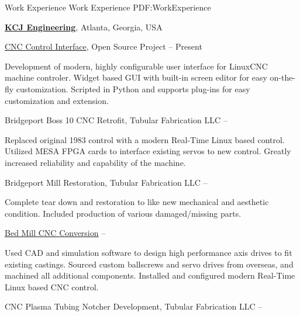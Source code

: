 \documentclass[letterpaper,MMMyyyy,nonstopmode]{resume}
\begin{document}
\begin{Body}

\Section
{Work Experience}
{Work Experience}
{PDF:WorkExperience}

\Entry
\href{http://www.kcjengr.com/}
{\textbf{KCJ Engineering}},
Atlanta, Georgia, USA

\Gap
\BulletItem
\href{https://github.com/KurtJacobson/hazzy/}{CNC Control Interface}, Open Source Project
\hfill
{} --
Present
\begin{Detail}
\SubBulletItem
Development of modern, highly configurable user interface for LinuxCNC machine controler.
\SubBulletItem
Widget based GUI with built-in screen editor for easy on-the-fly customization.
\SubBulletItem
Scripted in Python and supports plug-ins for easy customization and extension.
\end{Detail}

\Gap
{} Bridgeport Boss 10 CNC Retrofit, Tubular Fabrication LLC
\hfill
{} --
\begin{Detail}
\SubBulletItem
Replaced original 1983 control with a modern Real-Time Linux based control.
\SubBulletItem
Utilized MESA FPGA cards to interface existing servos to new control.
\SubBulletItem
Greatly increased reliability and capability of the machine.
\end{Detail}

\Gap
{} Bridgeport Mill Restoration, Tubular Fabrication LLC
\hfill
{} --
\begin{Detail}
\SubBulletItem
Complete tear down and restoration to like new mechanical and aesthetic condition.
\SubBulletItem
Included production of various damaged/missing parts.
\end{Detail}

\Gap
\BulletItem
\href{https://github.com/KurtJacobson/RF45-CNC/}{Bed Mill CNC Conversion}
\hfill
{} --
\begin{Detail}
\SubBulletItem
Used CAD and simulation software to design high performance axis drives to fit existing castings.
\SubBulletItem
Sourced custom ballscrews and servo drives from overseas, and machined all additional components.
\SubBulletItem
Installed and configured modern Real-Time Linux based CNC control.
\end{Detail}

\Gap
\BulletItem
CNC Plasma Tubing Notcher Development, Tubular Fabrication LLC
\hfill
{} --


\end{Body}
\end{document}
